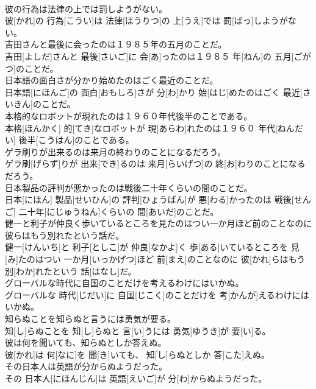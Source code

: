 \documentclass[8pt]{extreport}
\begin{document}
\begin{CJK}{UTF8}{min}
\\	彼の行為は法律の上では罰しようがない。	
\\	彼[かれ]の 行為[こうい]は 法律[ほうりつ]の 上[うえ]では 罰[ばっ]しようがない。
\\	吉田さんと最後に会ったのは１９８５年の五月のことだ。	
\\	吉田[よしだ]さんと 最後[さいご]に 会[あ]ったのは１９８５ 年[ねん]の 五月[ごがつ]のことだ。
\\	日本語の面白さが分かり始めたのはごく最近のことだ。	
\\	日本語[にほんご]の 面白[おもしろ]さが 分[わ]かり 始[はじ]めたのはごく 最近[さいきん]のことだ。
\\	本格的なロボットが現れたのは１９６０年代後半のことである。	
\\	本格[ほんかく] 的[てき]なロボットが 現[あらわ]れたのは１９６０ 年代[ねんだい] 後半[こうはん]のことである。
\\	ゲラ刷りが出来るのは来月の終わりのことになるだろう。	
\\	ゲラ刷[げらず]りが 出来[でき]るのは 来月[らいげつ]の 終[お]わりのことになるだろう。
\\	日本製品の評判が悪かったのは戦後二十年くらいの間のことだ。	
\\	日本[にほん] 製品[せいひん]の 評判[ひょうばん]が 悪[わる]かったのは 戦後[せんご] 二十年[にじゅうねん]くらいの 間[あいだ]のことだ。
\\	健一と利子が仲良く歩いているところを見たのはつい一か月ほど前のことなのに彼らはもう別れたという話だ。	
\\	健一[けんいち]と 利子[としこ]が 仲良[なかよ]く 歩[ある]いているところを 見[み]たのはつい 一か月[いっかげつ]ほど 前[まえ]のことなのに 彼[かれ]らはもう 別[わか]れたという 話[はなし]だ。
\\	グローバルな時代に自国のことだけを考えるわけにはいかぬ。	
\\	グローバルな 時代[じだい]に 自国[じこく]のことだけを 考[かんが]えるわけにはいかぬ。
\\	知らぬことを知らぬと言うには勇気が要る。	
\\	知[し]らぬことを 知[し]らぬと 言[い]うには 勇気[ゆうき]が 要[い]る。
\\	彼は何を聞いても、知らぬとしか答えぬ。	
\\	彼[かれ]は 何[なに]を 聞[き]いても、 知[し]らぬとしか 答[こた]えぬ。
\\	その日本人は英語が分からぬようだった。	
\\	その 日本人[にほんじん]は 英語[えいご]が 分[わ]からぬようだった。

\end{CJK}
\end{document}
